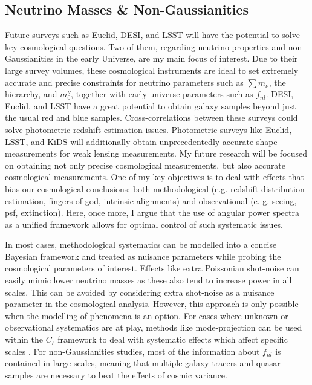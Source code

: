 \subsection{Neutrino Masses \& Non-Gaussianities}
Future surveys such as Euclid, DESI, and LSST will have the potential to solve key cosmological questions. Two of them, regarding neutrino properties and non-Gaussianities in the early Universe, are my main focus of interest. Due to their large survey volumes, these cosmological instruments are ideal to set extremely accurate and precise constraints for neutrino parameters such as $\sum m_{\nu}$, the hierarchy, and $m_{0}^{\nu}$, together with early universe parameters such as $f_{nl}$. DESI, Euclid, and LSST have a great potential to obtain galaxy samples beyond just the usual red and blue samples. Cross-correlations between these surveys could solve photometric redshift estimation issues. Photometric surveys like Euclid, LSST, and KiDS will additionally obtain unprecedentedly accurate shape measurements for weak lensing measurements. My future research will be focused on obtaining not only precise cosmological measurements, but also accurate cosmological measurements. One of my key objectives is to deal with effects that bias our cosmological conclusions: both methodological (e.g. redshift distribution estimation, fingers-of-god, intrinsic alignments) and observational (e. g. seeing, psf, extinction). Here, once more, I argue that the use of angular power spectra as a unified framework allows for optimal control of such systematic issues.

\qquad In most cases, methodological systematics can be modelled into a concise Bayesian framework and treated as nuisance parameters while probing the cosmological parameters of interest. Effects like extra Poissonian shot-noise can easily mimic lower neutrino masses as these also tend to increase power in all scales. This can be avoided by considering extra shot-noise as a nuisance parameter in the cosmological analysis. However, this approach is only possible when the modelling of phenomena is an option. For cases where unknown or observational systematics are at play, methods like mode-projection can be used within the $C_{\ell}$ framework to deal with systematic effects which affect specific scales \cite{Boris2013}. For non-Gaussianities studies, most of the information about $f_{nl}$ is contained in large scales, meaning that multiple galaxy tracers and quasar samples are necessary to beat the effects of cosmic variance.

